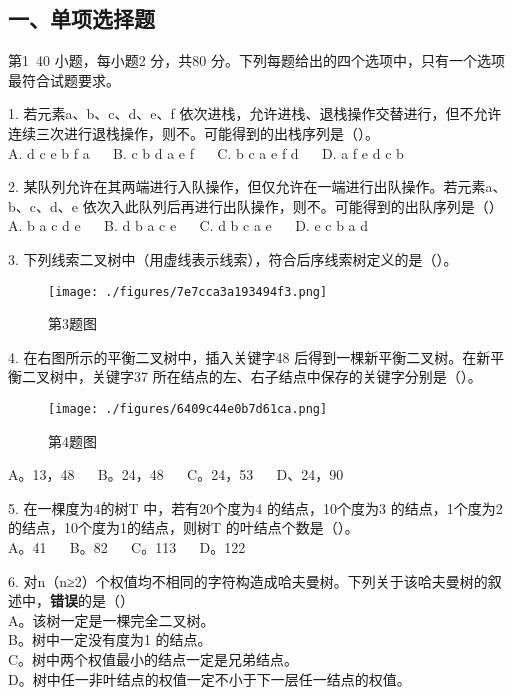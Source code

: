 
\subsection{一、单项选择题}
第1~40 小题，每小题2 分，共80 分。下列每题给出的四个选项中，只有一个选项最符合试题要求。

1. 若元素a、b、c、d、e、f 依次进栈，允许进栈、退栈操作交替进行，但不允许连续三次进行退栈操作，则不。可能得到的出栈序列是（）。 \\
A. d c e b f a $\quad$ B. c b d a e f $\quad$ C. b c a e f d $\quad$ D. a f e d c b

2. 某队列允许在其两端进行入队操作，但仅允许在一端进行出队操作。若元素a、b、c、d、e 依次入此队列后再进行出队操作，则不。可能得到的出队序列是（） \\
A. b a c d e $\quad$ B. d b a c e $\quad$ C. d b c a e $\quad$ D. e c b a d

3. 下列线索二叉树中（用虚线表示线索），符合后序线索树定义的是（）。\\
\begin{figure}[ht]
\centering
\texttt{[image: ./figures/7e7cca3a193494f3.png]}
\caption{第3题图} \label{fig_CSN10_1}
\end{figure}

4. 在右图所示的平衡二叉树中，插入关键字48 后得到一棵新平衡二叉树。在新平衡二叉树中，关键字37 所在结点的左、右子结点中保存的关键字分别是（）。 \\
\begin{figure}[ht]
\centering
\texttt{[image: ./figures/6409c44e0b7d61ca.png]}
\caption{第4题图} \label{fig_CSN10_2}
\end{figure}
A。13，48 $\quad$ B。24，48 $\quad$ C。24，53 $\quad$ D、24，90

5. 在一棵度为4的树T 中，若有20个度为4 的结点，10个度为3 的结点，1个度为2 的结点，10个度为1的结点，则树T 的叶结点个数是（）。 \\
A。41 $\quad$ B。82 $\quad$ C。113 $\quad$ D。122

6. 对n（n≥2）个权值均不相同的字符构造成哈夫曼树。下列关于该哈夫曼树的叙述中，\textbf{错误}的是（） \\
A。该树一定是一棵完全二叉树。 \\
B。树中一定没有度为1 的结点。 \\
C。树中两个权值最小的结点一定是兄弟结点。 \\
D。树中任一非叶结点的权值一定不小于下一层任一结点的权值。

